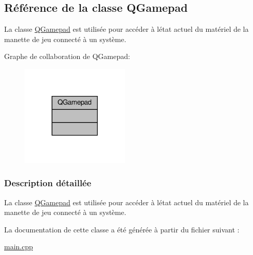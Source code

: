 \hypertarget{class_q_gamepad}{}\subsection{Référence de la classe Q\+Gamepad}
\label{class_q_gamepad}


La classe \hyperlink{class_q_gamepad}{Q\+Gamepad} est utilisée pour accéder à l\textquotesingle{}état actuel du matériel de la manette de jeu connecté à un système.  




Graphe de collaboration de Q\+Gamepad\+:\nopagebreak
\begin{figure}[H]
\begin{center}
\leavevmode
\includegraphics[width=146pt]{class_q_gamepad__coll__graph}
\end{center}
\end{figure}


\subsubsection{Description détaillée}
La classe \hyperlink{class_q_gamepad}{Q\+Gamepad} est utilisée pour accéder à l\textquotesingle{}état actuel du matériel de la manette de jeu connecté à un système. 

La documentation de cette classe a été générée à partir du fichier suivant \+:\begin{DoxyCompactItemize}
\item 
\hyperlink{main_8cpp}{main.\+cpp}\end{DoxyCompactItemize}
